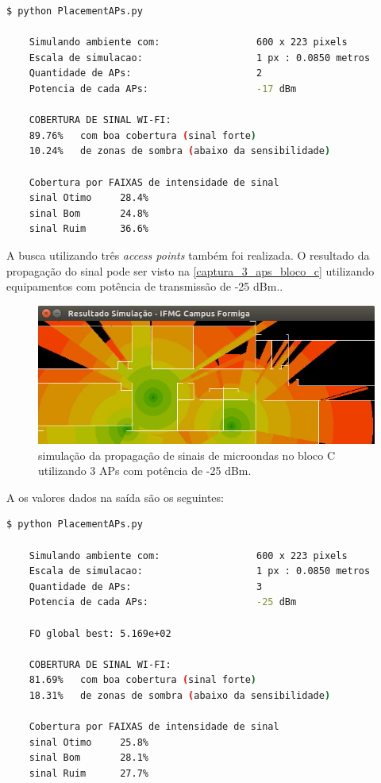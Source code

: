\documentclass[
	12pt,				%
	openright,			%
	twoside,			%
	a4paper,			%
	english,			%
	french,				%
	spanish,			%
	brazil				%
	]{abntex2}
\begin{document}
\begin{lstlisting}[language=bash]
	$ python PlacementAPs.py 
	
	Simulando ambiente com:                 600 x 223 pixels
	Escala de simulacao:                    1 px : 0.0850 metros
	Quantidade de APs:                      2
	Potencia de cada APs:                   -17 dBm
	
	COBERTURA DE SINAL WI-FI:
	89.76%   com boa cobertura (sinal forte)
	10.24%   de zonas de sombra (abaixo da sensibilidade)
	
	Cobertura por FAIXAS de intensidade de sinal
	sinal Otimo     28.4%
	sinal Bom       24.8%
	sinal Ruim      36.6%


\end{lstlisting}


A busca utilizando três \textit{access points} também foi realizada. O resultado da propagação do sinal pode ser visto na \autoref{captura_3_aps_bloco_c} utilizando equipamentos com potência de transmissão de -25 dBm..

\begin{figure}[ht]
	\caption{\label{captura_3_aps_bloco_c}simulação da propagação de sinais de microondas no bloco C utilizando 3 APs com potência de -25 dBm.
	}
	\begin{center}
		\includegraphics[scale=0.7]{images/captura-3-aps-bloco-c.jpg}
	\end{center}
\end{figure}

A os valores dados na saída são os seguintes:

\begin{lstlisting}[language=bash]
	$ python PlacementAPs.py 
	
	Simulando ambiente com:                 600 x 223 pixels
	Escala de simulacao:                    1 px : 0.0850 metros
	Quantidade de APs:                      3
	Potencia de cada APs:                   -25 dBm
	
	FO global best: 5.169e+02
	
	COBERTURA DE SINAL WI-FI:
	81.69%   com boa cobertura (sinal forte)
	18.31%   de zonas de sombra (abaixo da sensibilidade)
	
	Cobertura por FAIXAS de intensidade de sinal
	sinal Otimo     25.8%
	sinal Bom       28.1%
	sinal Ruim      27.7%

\end{lstlisting}
\end{document}
